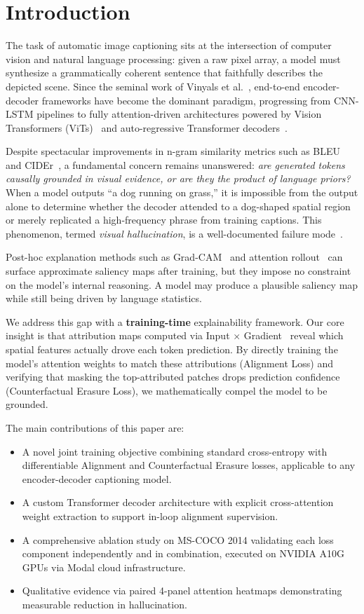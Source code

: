 \documentclass[conference]{IEEEtran}
\begin{document}
\section{Introduction}
\label{sec:intro}

The task of automatic image captioning sits at the intersection of computer vision and natural language processing: given a raw pixel array, a model must synthesize a grammatically coherent sentence that faithfully describes the depicted scene. Since the seminal work of Vinyals et al.~\cite{b1}, end-to-end encoder-decoder frameworks have become the dominant paradigm, progressing from CNN-LSTM pipelines to fully attention-driven architectures powered by Vision Transformers (ViTs)~\cite{b2} and auto-regressive Transformer decoders~\cite{b3}.

Despite spectacular improvements in n-gram similarity metrics such as BLEU~\cite{b4} and CIDEr~\cite{b5}, a fundamental concern remains unanswered: \textit{are generated tokens causally grounded in visual evidence, or are they the product of language priors?} When a model outputs ``a dog running on grass,'' it is impossible from the output alone to determine whether the decoder attended to a dog-shaped spatial region or merely replicated a high-frequency phrase from training captions. This phenomenon, termed \textit{visual hallucination}, is a well-documented failure mode~\cite{b6}.

Post-hoc explanation methods such as Grad-CAM~\cite{b7} and attention rollout~\cite{b8} can surface approximate saliency maps after training, but they impose no constraint on the model's internal reasoning. A model may produce a plausible saliency map while still being driven by language statistics.

We address this gap with a \textbf{training-time} explainability framework. Our core insight is that attribution maps computed via Input $\times$ Gradient~\cite{b9} reveal which spatial features actually drove each token prediction. By directly training the model's attention weights to match these attributions (Alignment Loss) and verifying that masking the top-attributed patches drops prediction confidence (Counterfactual Erasure Loss), we mathematically compel the model to be grounded.

The main contributions of this paper are:
\begin{itemize}
    \item A novel joint training objective combining standard cross-entropy with differentiable Alignment and Counterfactual Erasure losses, applicable to any encoder-decoder captioning model.
    \item A custom Transformer decoder architecture with explicit cross-attention weight extraction to support in-loop alignment supervision.
    \item A comprehensive ablation study on MS-COCO 2014 validating each loss component independently and in combination, executed on NVIDIA A10G GPUs via Modal cloud infrastructure.
    \item Qualitative evidence via paired 4-panel attention heatmaps demonstrating measurable reduction in hallucination.
\end{itemize}
\end{document}
